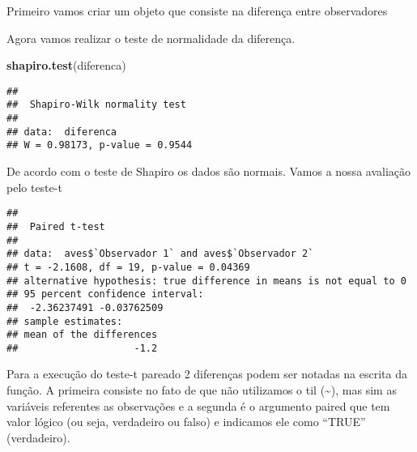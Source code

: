 \documentclass[titlepage, oneside, openany, a4paper]{book}
\newenvironment{Shaded}{\begin{snugshade}}{\end{snugshade}}
\newcommand{\DataTypeTok}[1]{\textcolor[rgb]{0.13,0.29,0.53}{#1}}
\newcommand{\FloatTok}[1]{\textcolor[rgb]{0.00,0.00,0.81}{#1}}
\newcommand{\KeywordTok}[1]{\textcolor[rgb]{0.13,0.29,0.53}{\textbf{#1}}}
\newcommand{\NormalTok}[1]{#1}
\newcommand{\OperatorTok}[1]{\textcolor[rgb]{0.81,0.36,0.00}{\textbf{#1}}}
\newcommand{\OtherTok}[1]{\textcolor[rgb]{0.56,0.35,0.01}{#1}}
\newcommand{\StringTok}[1]{\textcolor[rgb]{0.31,0.60,0.02}{#1}}
\begin{document}
Primeiro vamos criar um objeto que consiste na diferença entre observadores

\begin{Shaded}
\end{Shaded}

Agora vamos realizar o teste de normalidade da diferença.

\begin{Shaded}
\begin{Highlighting}[]
\KeywordTok{shapiro.test}\NormalTok{(diferenca)}
\end{Highlighting}
\end{Shaded}

\begin{verbatim}
## 
##  Shapiro-Wilk normality test
## 
## data:  diferenca
## W = 0.98173, p-value = 0.9544
\end{verbatim}

De acordo com o teste de Shapiro os dados são normais. Vamos a nossa avaliação pelo teste-t

\begin{Shaded}
\end{Shaded}

\begin{verbatim}
## 
##  Paired t-test
## 
## data:  aves$`Observador 1` and aves$`Observador 2`
## t = -2.1608, df = 19, p-value = 0.04369
## alternative hypothesis: true difference in means is not equal to 0
## 95 percent confidence interval:
##  -2.36237491 -0.03762509
## sample estimates:
## mean of the differences 
##                    -1.2
\end{verbatim}

Para a execução do teste-t pareado 2 diferenças podem ser notadas na escrita da função. A primeira consiste no fato de que não utilizamos o til (\textasciitilde{}), mas sim as variáveis referentes as observações e a segunda é o argumento paired que tem valor lógico (ou seja, verdadeiro ou falso) e indicamos ele como ``TRUE'' (verdadeiro).
\end{document}
